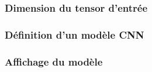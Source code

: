 
\begin{frame}
  \frametitle{Dimension du tensor d'entrée}
\end{frame}

\begin{frame}
  \frametitle{Définition d'un modèle CNN}
\end{frame}

\begin{frame}
  \frametitle{Affichage du modèle}
\end{frame}
